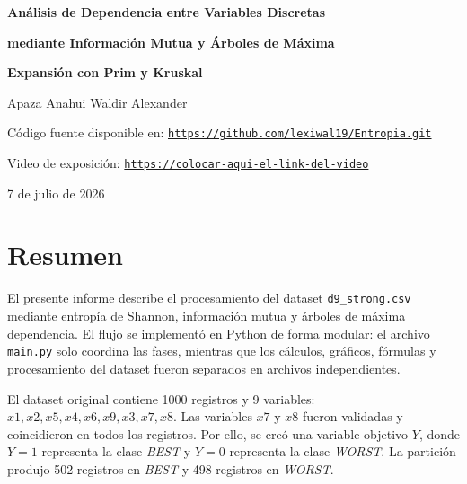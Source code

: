 \documentclass[12pt,a4paper]{article}
\begin{document}
\setlength{\parskip}{0.35em}
\raggedbottom

\begin{center}
    \vspace*{0.8cm}
    {\Large\bfseries Análisis de Dependencia entre Variables Discretas\par}
    \vspace{0.25cm}
    {\Large\bfseries mediante Información Mutua y Árboles de Máxima\par}
    \vspace{0.25cm}
    {\Large\bfseries Expansión con Prim y Kruskal\par}

    \vspace{0.9cm}
    {\normalsize Apaza Anahui Waldir Alexander\par}

    \vspace{0.35cm}
    {\small Código fuente disponible en:
    \href{https://github.com/lexiwal19/Entropia.git}{\texttt{https://github.com/lexiwal19/Entropia.git}}\par}

    \vspace{0.25cm}
    {\small Video de exposición:
    \href{https://colocar-aqui-el-link-del-video}{\texttt{https://colocar-aqui-el-link-del-video}}\par}

    \vspace{0.45cm}
    {\normalsize 7 de julio de 2026\par}
\end{center}

\vspace{0.6cm}

\section*{Resumen}

El presente informe describe el procesamiento del dataset \texttt{d9\_strong.csv} mediante entropía de Shannon, información mutua y árboles de máxima dependencia. El flujo se implementó en Python de forma modular: el archivo \texttt{main.py} solo coordina las fases, mientras que los cálculos, gráficos, fórmulas y procesamiento del dataset fueron separados en archivos independientes.

El dataset original contiene 1000 registros y 9 variables: \(x1,x2,x5,x4,x6,x9,x3,x7,x8\). Las variables \(x7\) y \(x8\) fueron validadas y coincidieron en todos los registros. Por ello, se creó una variable objetivo \(Y\), donde \(Y=1\) representa la clase \textit{BEST} y \(Y=0\) representa la clase \textit{WORST}. La partición produjo 502 registros en \textit{BEST} y 498 registros en \textit{WORST}.
\end{document}
